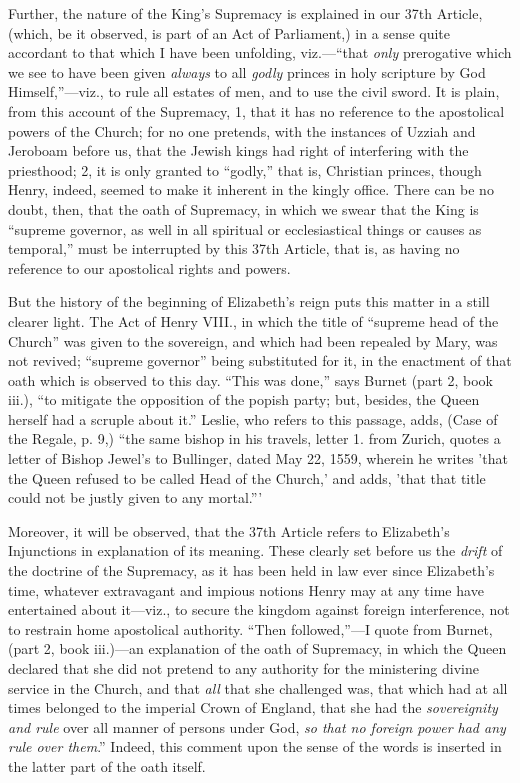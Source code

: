 Further, the nature of the
King's Supremacy is explained in our 37th Article, (which, be it
observed, is part of an Act of Parliament,) in a sense quite accordant
to that which I have been unfolding, viz.—``that \emph{only}
prerogative which we see to have been given \emph{always} to all \emph{godly}
princes in holy scripture by God Himself,''—viz., to rule all estates
of men, and to use the civil sword. It is plain, from this account of
the Supremacy, 1, that it has no reference to the apostolical powers
of the Church; for no one pretends, with the instances of Uzziah and
Jeroboam before us, that the Jewish kings had right of interfering with the priesthood; 2, it is only granted to ``godly,''
that is, Christian princes, though Henry, indeed, seemed to make it
inherent in the kingly office. There can be no doubt, then, that the
oath of Supremacy, in which we swear that the King is ``supreme
governor, as well in all spiritual or ecclesiastical things or causes
as temporal,'' must be interrupted by this 37th Article, that is, as
having no reference to our apostolical rights and powers.

But the history of the
beginning of Elizabeth's reign puts this matter in a still clearer
light. The Act of Henry VIII., in which the title of ``supreme head of
the Church'' was given to the sovereign, and which had been repealed by
Mary, was not revived; ``supreme governor'' being substituted for it, in
the enactment of that oath which is observed to this day. ``This was
done,'' says Burnet (part 2, book iii.), ``to mitigate the opposition of
the popish party; but, besides, the Queen herself had a scruple about
it.'' Leslie, who refers to this passage, adds, (Case of the Regale, p.
9,) ``the same bishop in his travels, letter 1. from Zurich, quotes a
letter of Bishop Jewel's to Bullinger, dated May 22, 1559, wherein he
writes 'that the Queen refused to be called Head of the Church,' and
adds, 'that that title could not be justly given to any mortal.'''

Moreover, it will be observed,
that the 37th Article refers to Elizabeth's Injunctions in explanation
of its meaning. These clearly set before us the \emph{drift} of the
doctrine of the Supremacy, as it has been held in law ever since
Elizabeth's time, whatever extravagant and impious notions Henry may
at any time have entertained about it—viz., to secure the kingdom
against foreign interference, not to restrain home apostolical
authority. ``Then followed,''—I quote from Burnet, (part 2, book
iii.)—an explanation of the oath of Supremacy, in which the Queen declared that she did not pretend to any authority for the
ministering divine service in the Church, and that \emph{all} that she
challenged was, that which had at all times belonged to the imperial
Crown of England, that she had the \emph{sovereignity and rule} over
all manner of persons under God, \emph{so that no foreign power had any
rule over them}.'' Indeed, this comment upon the sense of the words
is inserted in the latter part of the oath itself.

